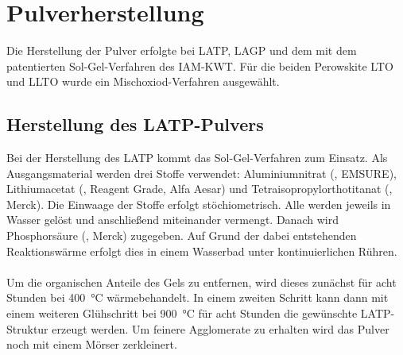 \documentclass[a4paper, 11pt, headsepline,footsepline,twoside,abstract]{scrbook}
\begin{document}
\section{Pulverherstellung}
Die Herstellung der Pulver erfolgte bei LATP, LAGP und dem  mit dem patentierten Sol-Gel-Verfahren des IAM-KWT. Für die beiden Perowskite LTO und LLTO wurde ein Mischoxiod-Verfahren ausgewählt.
\subsection{Herstellung des LATP-Pulvers}
\label{praep_LATP}
Bei der Herstellung des LATP kommt das Sol-Gel-Verfahren zum Einsatz. Als Ausgangsmaterial werden drei Stoffe verwendet: Aluminiumnitrat (, EMSURE), Lithiumacetat (, Reagent Grade, Alfa Aesar) und Tetra\-iso\-propyl\-ortho\-titanat (, Merck). Die Einwaage der Stoffe erfolgt stöchiometrisch. Alle werden jeweils in Wasser gelöst und anschließend miteinander vermengt. Danach wird Phosphorsäure (, Merck) zugegeben. Auf Grund der dabei entstehenden Reaktionswärme erfolgt dies in einem Wasserbad unter kontinuierlichen Rühren.
\\\\
Um die organischen Anteile des Gels zu entfernen, wird dieses zunächst für acht Stunden bei \SI{400}{\celsius} wärmebehandelt. In einem zweiten Schritt kann dann mit einem weiteren Glühschritt bei \SI{900}{\celsius} für acht Stunden die gewünschte LATP-Struktur erzeugt werden. Um feinere Agglomerate zu erhalten wird das Pulver noch mit einem Mörser zerkleinert.
\end{document}
